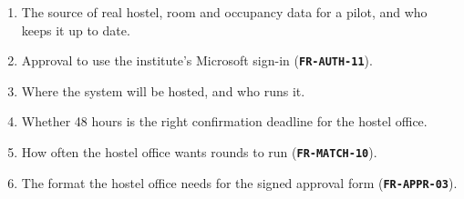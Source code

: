 \documentclass[11pt,a4paper,parskip=half,toc=listof]{scrreprt}
\newcommand{\Req}[1]{\textbf{\texttt{#1}}}
\begin{document}
\begin{enumerate}[label=\textbf{TBD-\arabic*},leftmargin=4.2em]
  \item The source of real hostel, room and occupancy data for a pilot,
    and who keeps it up to date.
  \item Approval to use the institute's Microsoft sign-in
    (\Req{FR-AUTH-11}).
  \item Where the system will be hosted, and who runs it.
  \item Whether 48 hours is the right confirmation deadline for the hostel
    office.
  \item How often the hostel office wants rounds to run
    (\Req{FR-MATCH-10}).
  \item The format the hostel office needs for the signed approval form
    (\Req{FR-APPR-03}).
\end{enumerate}
\end{document}

